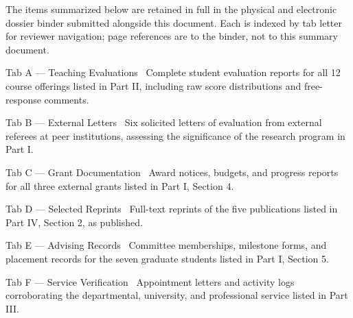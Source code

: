 
\noindent The items summarized below are retained in full in the physical and electronic dossier binder submitted alongside this document. Each is indexed by tab letter for reviewer navigation; page references are to the binder, not to this summary document.

\par
\begin{minipage}[t]{0.48\linewidth}
\begin{tabcard}{Tab A --- Teaching Evaluations}
\faChartLine\ Complete student evaluation reports for all 12 course offerings listed in Part II, including raw score distributions and free-response comments.
\end{tabcard}
\end{minipage}\hfill
\begin{minipage}[t]{0.48\linewidth}
\begin{tabcard}{Tab B --- External Letters}
\faEnvelope\ Six solicited letters of evaluation from external referees at peer institutions, assessing the significance of the research program in Part I.
\end{tabcard}
\end{minipage}
\par
\vspace{0.5em}
\begin{minipage}[t]{0.48\linewidth}
\begin{tabcard}{Tab C --- Grant Documentation}
\faTrophy\ Award notices, budgets, and progress reports for all three external grants listed in Part I, Section 4.
\end{tabcard}
\end{minipage}\hfill
\begin{minipage}[t]{0.48\linewidth}
\begin{tabcard}{Tab D --- Selected Reprints}
\faBook\ Full-text reprints of the five publications listed in Part IV, Section 2, as published.
\end{tabcard}
\end{minipage}
\par
\vspace{0.5em}
\begin{minipage}[t]{0.48\linewidth}
\begin{tabcard}{Tab E --- Advising Records}
\faUsers\ Committee memberships, milestone forms, and placement records for the seven graduate students listed in Part I, Section 5.
\end{tabcard}
\end{minipage}\hfill
\begin{minipage}[t]{0.48\linewidth}
\begin{tabcard}{Tab F --- Service Verification}
\faHandshake\ Appointment letters and activity logs corroborating the departmental, university, and professional service listed in Part III.
\end{tabcard}
\end{minipage}
\par

